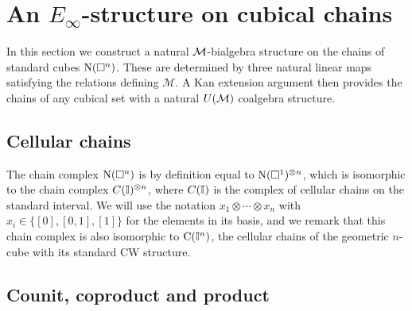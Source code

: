 
\section{An \texorpdfstring{$E_\infty$}{E-infty}-structure on cubical chains} \label{s:action}

In this section we construct a natural $\mathcal{M}$-bialgebra structure on the chains of standard cubes $\operatorname{N}(\square^n)$.
These are determined by three natural linear maps satisfying the relations defining $\mathcal M$.
A Kan extension argument then provides the chains of any cubical set with a natural $U(\mathcal{M})$ coalgebra structure.

\subsection{Cellular chains}

The chain complex $\operatorname{N}(\square^n)$ is by definition equal to $\operatorname{N}(\square^1)^{\otimes n}$, which is isomorphic to the chain complex $C(\mathbb{I})^{\otimes n}$, where $C(\mathbb{I})$ is the complex of cellular chains on the standard interval.
We will use the notation $x_1 \otimes \cdots \otimes x_n$ with $x_i \in \{[0], [0,1], [1]\}$ for the elements in its basis, and we remark that this chain complex is also isomorphic to $\operatorname{C}(\mathbb{I}^n)$, the cellular chains of the geometric $n$-cube with its standard CW structure.

\subsection{Counit, coproduct and product}

